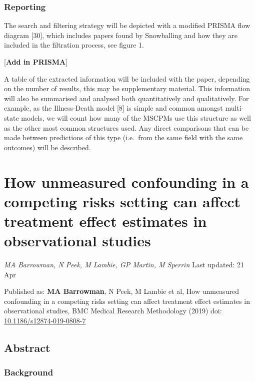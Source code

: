 \documentclass[12pt,PhD,twoside,openright]{muthesis}
\begin{document}
\hypertarget{reporting}{%
\subsection{Reporting}\label{reporting}}

The search and filtering strategy will be depicted with a modified PRISMA flow diagram {[}30{]}, which includes papers found by Snowballing and how they are included in the filtration process, see figure 1.

{[}\textbf{Add in PRISMA}{]}

A table of the extracted information will be included with the paper, depending on the number of results, this may be supplementary material. This information will also be summarised and analysed both quantitatively and qualitatively. For example, as the Illness-Death model {[}8{]} is simple and common amongst multi-state models, we will count how many of the MSCPMs use this structure as well as the other most common structures used. Any direct comparisons that can be made between predictions of this type (i.e.~from the same field with the same outcomes) will be described.

\hypertarget{chap-Conf-CR}{%
\chapter{How unmeasured confounding in a competing risks setting can affect treatment effect estimates in observational studies}\label{chap-Conf-CR}}

\emph{MA Barrowman, N Peek, M Lambie, GP Martin, M Sperrin}
Last updated: 21 Apr

Published as: \textbf{MA Barrowman}, N Peek, M Lambie et al, How unmeasured confounding in a competing risks setting can affect treatment effect estimates in observational studies, BMC Medical Research Methodology (2019) doi: \href{https://doi.org/10.1186/s12874-019-0808-7}{10.1186/s12874-019-0808-7}

\hypertarget{abstract}{%
\section*{Abstract}\label{abstract}}

\hypertarget{background}{%
\subsection*{Background}\label{background}}
\end{document}
